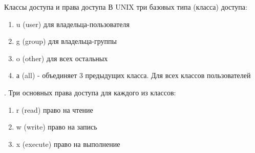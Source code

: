 \begin{frame}{Классы доступа и права доступа}
  В UNIX три базовых типа (класса) доступа:
  \begin{enumerate}
    \item \alert{u} (user) для владельца-пользователя
    \item \alert{g} (group) для владельца-группы         
    \item \alert{o} (other) для всех остальных \pause
    \item \alert{а} (all) - объединяет 3 предыдущих класса. Для всех классов пользователей
  \end{enumerate} \pause 
  .\newline 
  Три основных права доступа для каждого из классов:
  \begin{enumerate}
    \item \alert{r} (read) право на чтение           
    \item \alert{w} (write) право на запись           
    \item \alert{x} (execute) право на выполнение  
  \end{enumerate}

\end{frame}
